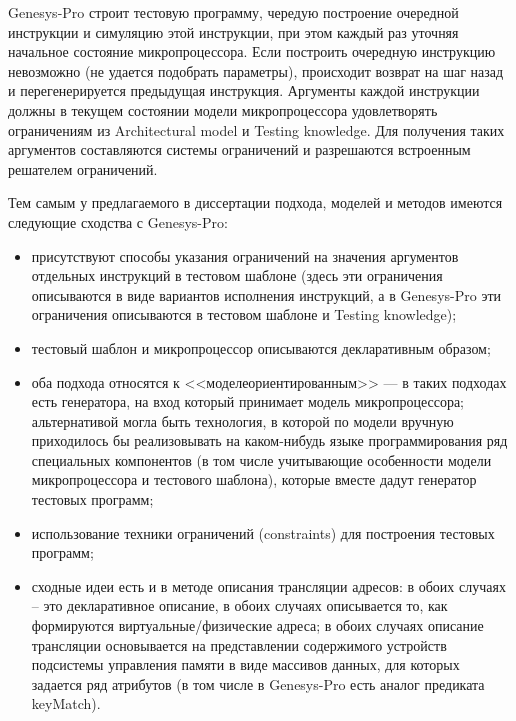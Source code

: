 Genesys-Pro строит тестовую программу, чередую построение очередной инструкции и симуляцию этой инструкции, при этом каждый раз уточняя начальное состояние микропроцессора. Если построить очередную инструкцию невозможно (не удается подобрать параметры), происходит возврат на шаг назад и перегенерируется предыдущая инструкция. Аргументы каждой инструкции должны в текущем состоянии модели микропроцессора удовлетворять ограничениям из Architectural model и Testing knowledge. Для получения таких аргументов составляются системы ограничений и разрешаются встроенным решателем ограничений.


Тем самым у предлагаемого в диссертации подхода, моделей и методов имеются следующие сходства с Genesys-Pro:
\begin{itemize}
    \item присутствуют способы указания ограничений на значения аргументов отдельных инструкций в тестовом шаблоне (здесь эти ограничения описываются в  виде вариантов исполнения инструкций, а в Genesys-Pro эти ограничения описываются в тестовом шаблоне и Testing knowledge);
    \item тестовый шаблон и микропроцессор описываются декларативным образом;
    \item оба подхода относятся к <<моделеориентированным>> --- в таких подходах есть генератора, на вход который принимает модель микропроцессора; альтернативой могла быть технология, в которой по модели вручную приходилось бы реализовывать на каком-нибудь языке программирования ряд специальных компонентов (в том числе учитывающие особенности модели микропроцессора и тестового шаблона), которые вместе дадут генератор тестовых программ;
    \item использование техники ограничений (constraints) для построения тестовых программ;
    \item сходные идеи есть и в методе описания трансляции адресов: в обоих случаях -- это декларативное описание, в обоих случаях описывается то, как формируются виртуальные/физические адреса; в обоих случаях описание трансляции основывается на представлении содержимого устройств подсистемы управления памяти в виде массивов данных, для которых задается ряд атрибутов (в том числе в Genesys-Pro есть аналог предиката keyMatch).
\end{itemize}

